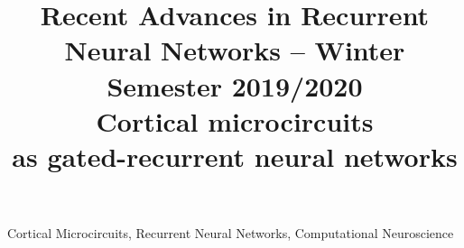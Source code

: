\documentclass[conference]{IEEEtran}
\begin{document}
\title{
    {\large Recent Advances in Recurrent Neural Networks -- Winter Semester 2019/2020}\\
    Cortical microcircuits\\as gated-recurrent neural networks
}

\author{
}

\maketitle



\begin{IEEEkeywords}
Cortical Microcircuits, Recurrent Neural Networks, Computational Neuroscience
\end{IEEEkeywords}








%


\end{document}
